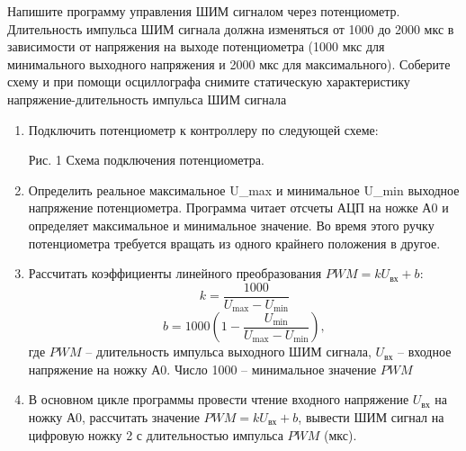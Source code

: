 
Напишите программу управления ШИМ сигналом через потенциометр. Длительность импульса ШИМ сигнала должна изменяться от 1000 до 2000 мкс в зависимости от напряжения на выходе потенциометра (1000 мкс для минимального выходного напряжения и 2000 мкс для максимального). Соберите схему и при помощи осциллографа снимите статическую характеристику напряжение-длительность импульса ШИМ сигнала
\solutionSection
\begin{enumerate}
    \item Подключить потенциометр к контроллеру по следующей схеме:
          \begin{center}
             Рис. 1 Схема подключения потенциометра.
          \end{center}
          
    \item Определить реальное максимальное U_max и минимальное U_min выходное напряжение потенциометра. Программа читает отсчеты АЦП на ножке А0 и определяет максимальное и минимальное значение. Во время этого ручку потенциометра требуется вращать из одного крайнего положения в другое.
    \item Рассчитать коэффициенты линейного преобразования $PWM=kU_\text{вх}+b$:
    $$k=\frac{1000}{U_\text{max}-U_\text{min}}$$
    $$b=1000\left(1-\frac{U_\text{min}}{U_\text{max}-U_\text{min}}\right),$$
    где $PWM$ – длительность импульса выходного ШИМ сигнала, $U_\text{вх}$ – входное напряжение на ножку А0. Число 1000 – минимальное значение $PWM$
    \item В основном цикле программы провести чтение входного напряжение $U_\text{вх}$ на ножку А0, рассчитать значение $PWM=kU_\text{вх}+b$, вывести ШИМ сигнал на цифровую ножку 2 с длительностью импульса $PWM$ (мкс).
\end{enumerate}
